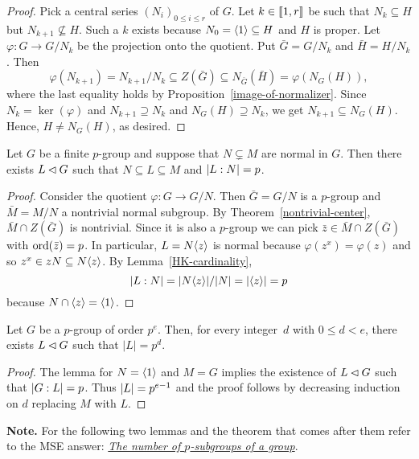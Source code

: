 \begin{proof} Pick a central series $(N_i)_{0\le i\le r}$ of $G$. Let $k\in\llbracket1,r\rrbracket$ be such that $N_k\subseteq H$ but $N_{k+1}\not\subseteq H$. Such a $k$ exists because $N_0=\langle1\rangle\subseteq H$ and $H$ is proper. Let $\varphi\colon G\to G/N_k$ be the projection onto the quotient. Put $\bar G=G/N_k$ and $\bar H=H/N_k$. Then
$$
    \varphi(N_{k+1})=N_{k+1}/N_k\subseteq Z(\bar G) \subseteq N_{\bar G}(\bar H)=\varphi(N_G(H)),
$$
where the last equality holds by Proposition~\ref{image-of-normalizer}. Since $N_k=\ker(\varphi)$ and $N_{k+1}\supseteq N_k$ and $N_G(H)\supseteq N_k$, we get $N_{k+1}\subseteq N_G(H)$. Hence, $H\ne N_G(H)$, as desired.  \end{proof}

\begin{lem}\label{subgroup-of-index-p}
    Let\/ $G$ be a finite\/ $p$-group and suppose that\/ $N\varsubsetneq M$ are normal in\/ $G$. Then there exists\/ $L\lhd G$ such that\/ $N \subseteq L \subseteq M$ and\/ $\left\vert{L:N}\right\vert=p$.
\end{lem}

\begin{proof} Consider the quotient $\varphi\colon G\to G/N$. Then $\bar G=G/N$ is a $p$-group and $\bar M=M/N$ a nontrivial normal subgroup. By Theorem~\ref{nontrivial-center}, $\bar M\cap Z(\bar G)$ is nontrivial. Since it is also a $p$-group we can pick $\bar z\in\bar M\cap Z(\bar G)$ with ${\rm ord}(\bar z)=p$. In particular, $L=N\langle z\rangle$ is normal because $\varphi(z^x) = \varphi(z)$ and so $z^x\in zN\subseteq N\langle z\rangle$. By Lemma~\ref{HK-cardinality},
$$
    \left\vert{L:N}\right\vert=|N\langle z\rangle|/|N|=|\langle z\rangle|=p
$$
because $N\cap\langle z\rangle=\langle1\rangle$.  \end{proof}

\begin{thm}\label{p^d-subgroups}
    Let\/ $G$ be a $p$-group of order $p^e$. Then, for every integer~$d$ with $0\le d<e$, there exists $L\lhd G$ such that $|L| = p^d$.
\end{thm}

\begin{proof} The lemma for $N=\langle1\rangle$ and $M=G$ implies the existence of $L\lhd G$ such that $\left\vert{G:L}\right\vert=p$. Thus $\left\vert{L}\right\vert=p^{e-1}$ and the proof follows by decreasing induction on $d$ replacing $M$ with $L$.  \end{proof}

\medskip

\textbf{Note.} For the following two lemmas and the theorem that comes after them refer to the MSE answer: \href{https://math.stackexchange.com/a/1586494/269050}{\it The number of\/ $p$-subgroups of a group}.

